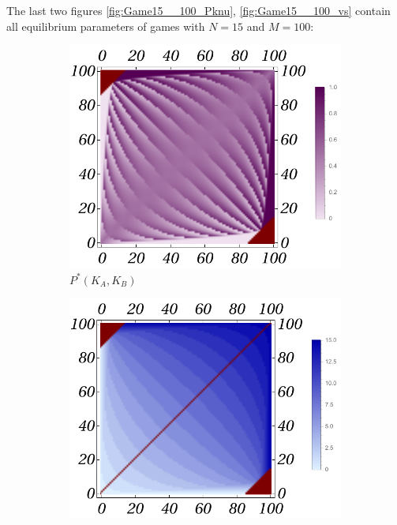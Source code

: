 \documentclass{article}
\theoremstyle{definition}
\begin{document}
The last two figures \ref{fig:Game15__100_Pknu}, \ref{fig:Game15__100_vs} contain all equilibrium parameters of games with $N=15$ and $M=100$:

\begin{figure}[H]
    \centering
    \begin{subfigure}[b]{0.3\textwidth}
        \includegraphics[width=\textwidth]{img/P_Plot_15_100.pdf}
        \caption{$P^*(K_A,K_B)$}
        \label{fig:sub15}
    \end{subfigure}
    \hfill %
    \begin{subfigure}[b]{0.3\textwidth}
        \includegraphics[width=\textwidth]{img/k_Plot_15_100.pdf}

\end{subfigure}
\end{figure}
\end{document}
